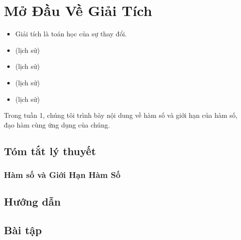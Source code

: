   
\chapter{Mở Đầu Về Giải Tích}

\begin{itemize}
    \item Giải tích là toán học của sự thay đổi.

    \item (lịch sử)

    \item (lịch sử)

    \item (lịch sử)
    \item (lịch sử)

\end{itemize}
\noindent Trong tuần 1, chúng tôi trình bày nội dung về hàm số và giới hạn của hàm số, đạo hàm cùng ứng dụng của chúng.
\newpage
\section{Tóm tắt lý thuyết}
\subsection{Hàm số và Giới Hạn Hàm Số}

\section{Hướng dẫn}
\section{Bài tập}

